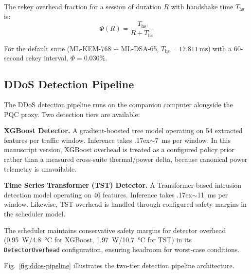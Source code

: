 \documentclass[conference]{IEEEtran}
\begin{document}
The rekey overhead fraction for a session of duration $R$ with handshake time $T_{\mathrm{hs}}$ is:
\begin{equation}
\label{eq:rekey-overhead}
    \Phi(R) = \frac{T_{\mathrm{hs}}}{R + T_{\mathrm{hs}}}
\end{equation}

For the default suite (ML-KEM-768 + ML-DSA-65, $T_{\mathrm{hs}} = \SI{17.811}{\milli\second}$) with a 60-second rekey interval, $\Phi = 0.030\%$.

\subsection{DDoS Detection Pipeline}

The DDoS detection pipeline runs on the companion computer alongside the PQC proxy.
Two detection tiers are available:

\textbf{XGBoost Detector.}
A gradient-boosted tree model operating on 54 extracted features per traffic window.
Inference takes {\raise.17ex\hbox{$\scriptstyle\sim$}}\SI{7}{\milli\second} per window.
In this manuscript version, XGBoost overhead is treated as a configured policy prior rather than a measured cross-suite thermal/power delta, because canonical power telemetry is unavailable.

\textbf{Time Series Transformer (TST) Detector.}
A Transformer-based intrusion detection model operating on 46 features.
Inference takes {\raise.17ex\hbox{$\scriptstyle\sim$}}\SI{11}{\milli\second} per window.
Likewise, TST overhead is handled through configured safety margins in the scheduler model.

The scheduler maintains conservative safety margins for detector overhead (\SI{0.95}{\watt}/\SI{4.8}{\celsius} for XGBoost, \SI{1.97}{\watt}/\SI{10.7}{\celsius} for TST) in its \texttt{DetectorOverhead} configuration, ensuring headroom for worst-case conditions.

Fig.~\ref{fig:ddos-pipeline} illustrates the two-tier detection pipeline architecture.
\end{document}
